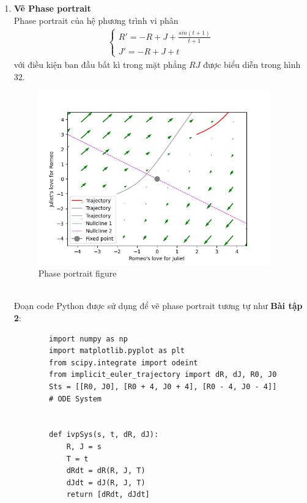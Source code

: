 \begin{enumerate}
\begin{itemize}
    \end{itemize}
    \item \textbf{Vẽ Phase portrait}\\
    Phase portrait của hệ phương trình vi phân
    \begin{align*}
        \begin{cases}
            R'=-R+J+\frac{sin(t+1)}{t+1}\\
            J'=-R+J+t
        \end{cases}
    \end{align*}
    với điều kiện ban đầu bất kì trong mặt phẳng $RJ$ được biểu diễn trong hình 32.
    \begin{figure}[h!]
        \begin{center}
        \includegraphics[width=10cm]{images/euler_1_portrait.png}
        \end{center}
        \caption{Phase portrait figure}
    \end{figure}\\
    Đoạn code Python được sử dụng để vẽ phase portrait tương tự như \textbf{Bài tập 2}:
    \begin{lstlisting}
        import numpy as np
        import matplotlib.pyplot as plt
        from scipy.integrate import odeint
        from implicit_euler_trajectory import dR, dJ, R0, J0
        Sts = [[R0, J0], [R0 + 4, J0 + 4], [R0 - 4, J0 - 4]]
        # ODE System
        
        
        def ivpSys(s, t, dR, dJ):
            R, J = s
            T = t
            dRdt = dR(R, J, T)
            dJdt = dJ(R, J, T)
            return [dRdt, dJdt]
        

\end{lstlisting}
\end{enumerate}

